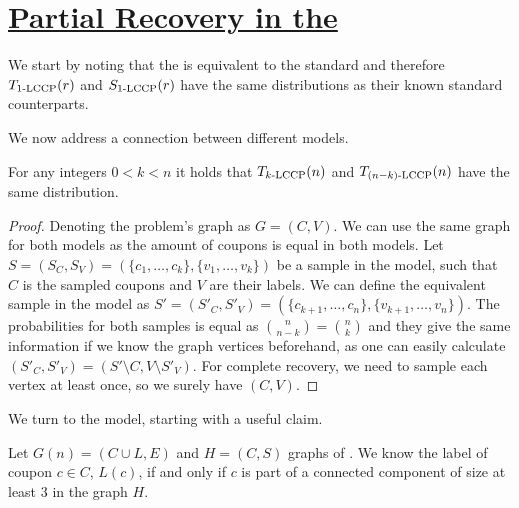 \section{\texorpdfstring{\hyperref[Problem:Partial Coverage]{Partial Recovery in the \ekecd[k]}}{Partial Recovery in the \ekecd[k]}}
\label{sec:partial_recovery}
We start by noting that the  is equivalent to the standard  and therefore 
$\T{\kecd{1}{n}}{r}$ and $\ST{\kecd{1}{n}}{r}$ have the same distributions as their known standard counterparts.

We now address a connection between different \ekecd models.
\begin{lemma}
\label{lemma:n-k and k}
    For any integers $ 0 < k < n$ it holds that $\T{\kecd{k}{n}}{n}$ and $\T{\kecd{(n-k)}{n}}{n}$ have the same distribution.
\end{lemma}
\begin{proof}
    Denoting the problem's graph as $G=(C,V)$. We can use the same graph for both models as the amount of coupons is equal in both models.
    Let  $S=(S_C,S_V)=(\{c_1,\dots,c_k\},\{v_1,\dots,v_k\})$ be a sample in the  model,
    such that $C$ is the sampled coupons and $V$ are their labels.
    We can define the equivalent sample in the  model as $S'=(S'_C,S'_V)=(\{c_{k+1},\dots,c_n\},\{v_{k+1},\dots,v_n\})$.
    The probabilities for both samples is equal as $\binom{n}{n-k}=\binom{n}{k}$ and they give the same information if we know the graph vertices beforehand, as one can easily calculate $(S'_C,S'_V) = (S'\setminus C,V \setminus S'_V)$.
    For complete recovery, we need to sample each vertex at least once, so we surely have $(C,V)$.
\end{proof}


We turn to the  model, starting with a useful claim.
\begin{lemma}
\label{claim:knowing_c__size_3}
    Let $G(n) = (C\cup L, E)$ and $H=(C,S)$ graphs of .
    We know the label of coupon $c\in C$, $L(c)$, if and only if $c$ is part of a connected component of size at least $3$ in the graph $H$. 
\end{lemma}

